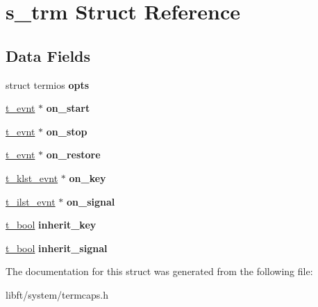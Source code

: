 \hypertarget{structs__trm}{}\section{s\+\_\+trm Struct Reference}
\label{structs__trm}
\subsection*{Data Fields}
\begin{DoxyCompactItemize}
\item 
\hypertarget{structs__trm_a90b56479a46d655952f0bf981d6f3e91}{}struct termios {\bfseries opts}\label{structs__trm_a90b56479a46d655952f0bf981d6f3e91}

\item 
\hypertarget{structs__trm_a7d6953b64414f291d1c18f186b74b230}{}\hyperlink{structs__evnt}{t\+\_\+evnt} $\ast$ {\bfseries on\+\_\+start}\label{structs__trm_a7d6953b64414f291d1c18f186b74b230}

\item 
\hypertarget{structs__trm_a321e76e009fc95ff67ef444ecb597a9d}{}\hyperlink{structs__evnt}{t\+\_\+evnt} $\ast$ {\bfseries on\+\_\+stop}\label{structs__trm_a321e76e009fc95ff67ef444ecb597a9d}

\item 
\hypertarget{structs__trm_a47bfbcebdc4a67a4ae1228ce263f142a}{}\hyperlink{structs__evnt}{t\+\_\+evnt} $\ast$ {\bfseries on\+\_\+restore}\label{structs__trm_a47bfbcebdc4a67a4ae1228ce263f142a}

\item 
\hypertarget{structs__trm_a45334e34d2cd39e60f29d30f32d6de66}{}\hyperlink{structs__klst__evnt}{t\+\_\+klst\+\_\+evnt} $\ast$ {\bfseries on\+\_\+key}\label{structs__trm_a45334e34d2cd39e60f29d30f32d6de66}

\item 
\hypertarget{structs__trm_aa23b7da63f3504f31e33c3002cc981b6}{}\hyperlink{structs__ilst__evnt}{t\+\_\+ilst\+\_\+evnt} $\ast$ {\bfseries on\+\_\+signal}\label{structs__trm_aa23b7da63f3504f31e33c3002cc981b6}

\item 
\hypertarget{structs__trm_a4fdf62d53a6f8c55c1a8cd4f04c1a19a}{}\hyperlink{booleans_8h_af9847afb81a785e63ca83f8594e45c72}{t\+\_\+bool} {\bfseries inherit\+\_\+key}\label{structs__trm_a4fdf62d53a6f8c55c1a8cd4f04c1a19a}

\item 
\hypertarget{structs__trm_a4f9276e4aeca3e80e8af8ac4677e5d32}{}\hyperlink{booleans_8h_af9847afb81a785e63ca83f8594e45c72}{t\+\_\+bool} {\bfseries inherit\+\_\+signal}\label{structs__trm_a4f9276e4aeca3e80e8af8ac4677e5d32}

\end{DoxyCompactItemize}


The documentation for this struct was generated from the following file\+:\begin{DoxyCompactItemize}
\item 
libft/system/termcaps.\+h\end{DoxyCompactItemize}
